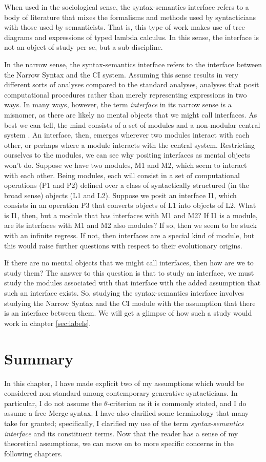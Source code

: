 When used in the sociological sense, the syntax-semantics interface refers to a body of literature that mixes the formalisms and methods used by syntacticians with those used by semanticists.
That is, this type of work makes use of tree diagrams and expressions of typed lambda calculus.
In this sense, the interface is not an object of study per se, but a sub-discipline.

In the narrow sense, the syntax-semantics interface refers to the interface between the Narrow Syntax and the CI system.
Assuming this sense results in very different sorts of analyses compared to the standard analyses, analyses that posit computational procedures rather than merely representing expressions in two ways.
In many ways, however, the term \textit{interface} in its narrow sense is a misnomer, as there are likely no mental objects that we might call interfaces.
As best we can tell, the mind consists of a set of modules and a non-modular central system \parencite{fodor1983modularity,fodor2001mind}.
An interface, then, emerges wherever two modules interact with each other, or perhaps where a module interacts with the central system.
Restricting ourselves to the modules, we can see why positing interfaces as mental objects won't do.
Suppose we have two modules, M1 and M2, which seem to interact with each other.
Being modules, each will consist in a set of computational operations (P1 and P2) defined over a class of syntactically structured (in the broad sense) objects (L1 and L2).
Suppose we posit an interface I1, which consists in an operation P3 that converts objects of L1 into objects of L2.
What is I1, then, but a module that has interfaces with M1 and M2?
If I1 is a module, are its interfaces with M1 and M2 also modules?
If so, then we seem to be stuck with an infinite regress.
If not, then interfaces are a special kind of module, but this would raise further questions with respect to their evolutionary origins.

If there are no mental objects that we might call interfaces, then how are we to study them?
The answer to this question is that to study an interface, we must study the modules associated with that interface with the added assumption that such an interface exists.
So, studying the syntax-semantics interface involves studying the Narrow Syntax and the CI module with the assumption that there is an interface between them.
We will get a glimpse of how such a study would work in chapter \ref{sec:labels}.

\section{Summary}
In this chapter, I have made explicit two of my assumptions which would be considered non-standard among contemporary generative syntacticians.
In particular, I do not assume the $\theta$-criterion as it is commonly stated, and I do assume a free Merge syntax.
I have also clarified some terminology that many take for granted; specifically, I clarified my use of the term \textit{syntax-semantics interface} and its constituent terms.
Now that the reader has a sense of my theoretical assumptions, we can move on to more specific concerns in the following chapters.
